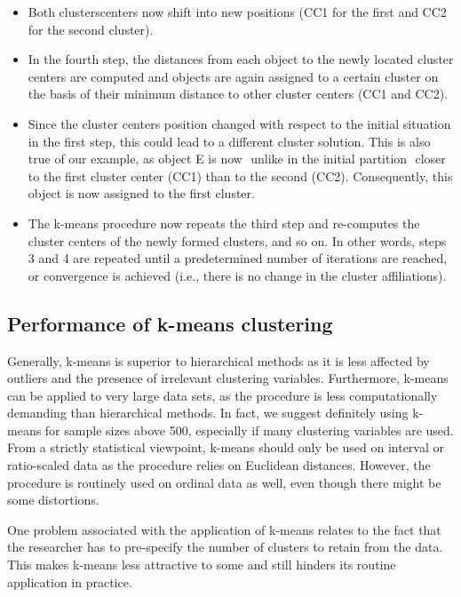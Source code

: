 \documentclass[a4paper,12pt]{article}
\begin{document}
\begin{itemize}
\item Both clusterscenters now shift into new positions (CC1 for the first and CC2 for the second cluster).
\item In the fourth step, the distances from each object to the newly located cluster
centers are computed and objects are again assigned to a certain cluster on the basis
of their minimum distance to other cluster centers (CC1 and CC2).

\item Since the cluster centers position changed with respect to the initial situation in the first step,
this could lead to a different cluster solution. This is also true of our example, as
object E is now  unlike in the initial partition  closer to the first cluster center
(CC1) than to the second (CC2). Consequently, this object is now assigned to the
first cluster.
\item The k-means procedure now repeats the third step and
re-computes the cluster centers of the newly formed clusters, and so on.
In other words, steps 3 and 4 are repeated until a predetermined number of iterations are
reached, or convergence is achieved (i.e., there is no change in the cluster affiliations).
\end{itemize}

\newpage
\subsection{Performance of k-means clustering}
Generally, k-means is superior to hierarchical methods as it is less affected by
outliers and the presence of irrelevant clustering variables. Furthermore, k-means
can be applied to very large data sets, as the procedure is less computationally
demanding than hierarchical methods. In fact, we suggest definitely using k-means
for sample sizes above 500, especially if many clustering variables are used. From
a strictly statistical viewpoint, k-means should only be used on interval or ratio-scaled
data as the procedure relies on Euclidean distances. However, the procedure is
routinely used on ordinal data as well, even though there might be some distortions.

One problem associated with the application of k-means relates to the fact that
the researcher has to pre-specify the number of clusters to retain from the data. This
makes k-means less attractive to some and still hinders its routine application in
practice.
\end{document}
